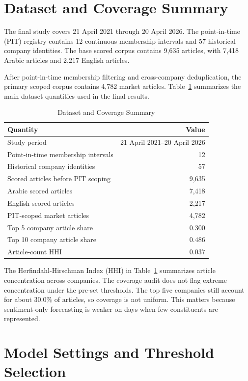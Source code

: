 \section{Dataset and Coverage Summary}

The final study covers 21 April 2021 through 20 April 2026. The point-in-time (PIT) registry contains 12 continuous membership intervals and 57 historical company identities. The base scored corpus contains 9,635 articles, with 7,418 Arabic articles and 2,217 English articles.

After point-in-time membership filtering and cross-company deduplication, the primary scoped corpus contains 4,782 market articles. Table~\ref{tab:dataset_summary} summarizes the main dataset quantities used in the final results.

\begin{table}[ht]
\centering
\caption{Dataset and Coverage Summary}
\label{tab:dataset_summary}
\small
\begin{tabular}{lr}
\toprule
Quantity & Value \\
\midrule
Study period & 21 April 2021--20 April 2026 \\
Point-in-time membership intervals & 12 \\
Historical company identities & 57 \\
Scored articles before PIT scoping & 9,635 \\
Arabic scored articles & 7,418 \\
English scored articles & 2,217 \\
PIT-scoped market articles & 4,782 \\
Top 5 company article share & 0.300 \\
Top 10 company article share & 0.486 \\
Article-count HHI & 0.037 \\
\bottomrule
\end{tabular}
\end{table}

The Herfindahl-Hirschman Index (HHI) in Table~\ref{tab:dataset_summary} summarizes article concentration across companies. The coverage audit does not flag extreme concentration under the pre-set thresholds. The top five companies still account for about 30.0\% of articles, so coverage is not uniform. This matters because sentiment-only forecasting is weaker on days when few constituents are represented.

\section{Model Settings and Threshold Selection}

